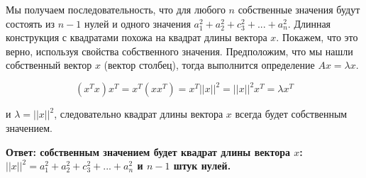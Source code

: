 \documentclass[a4paper,12pt]{article}
\begin{document}
\begin{enumerate}
Мы получаем последовательность, что для любого $n$ собственные значения будут состоять из $n-1$ нулей и одного значения $a_1^2 + a_2^2 + c_3^2+...+a^2_n$.
Длинная конструкция с квадратами похожа на квадрат длины вектора $x$. Покажем, что это верно, используя свойства собственного значения. Предположим, что мы нашли собственный вектор $x$ (вектор столбец), тогда выполнится определение $Ax=\lambda x$.


$$(x^Tx)x^T = x^T(xx^T)=x^T{||x||}^2={||x||}^2x^T=\lambda x^T$$

и $\lambda={||x||}^2$, следовательно квадрат длины вектора $x$ всегда будет собственным значением.

\textbf{Ответ: собственным значением будет квадрат длины вектора $x$: ${||x||}^2=a_1^2 + a_2^2 + c_3^2+...+a^2_n$ и $n-1$ штук нулей.}

\end{enumerate}
\end{document}
